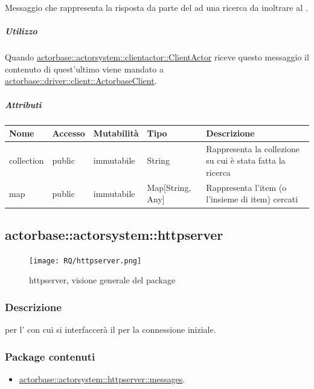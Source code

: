 \documentclass{scalatekids-article}
\begin{document}
Messaggio che rappresenta la risposta da parte del  ad una ricerca da inoltrare
al .

\subparagraph{Utilizzo}

Quando \hyperref[sec:actorbase::actorsystem::clientactor::ClientActor]{actorbase::actorsystem::clientactor::ClientActor}
riceve questo messaggio il contenuto di quest'ultimo viene
mandato a \hyperref[sec:actorbase::driver::client::ActorbaseClient]{actorbase::driver::\allowbreak{}client::\allowbreak{}ActorbaseClient}.

\subparagraph{Attributi}
\begin{tabular}{| p{1.5cm} | p{1.5cm} | p{2cm} | p{3.5cm} | p{8.5cm} |}
  \hline
  Nome & Accesso & Mutabilità & Tipo & Descrizione\\
  \hline
  collection & public & immutabile & String & Rappresenta la collezione su cui è stata fatta la ricerca \\
  \hline
  map & public & immutabile & Map[String, Any] & Rappresenta l'item (o l'insieme di item) cercati \\
  \hline
\end{tabular}


\subsection{actorbase::actorsystem::httpserver}
\label{sec:actorbase::actorsystem::httpserver}

\begin{figure}[H]
  \begin{center}
    \texttt{[image: RQ/httpserver.png]}
    \caption{httpserver, visione generale del package}
  \end{center}
\end{figure}

\subsubsection{Descrizione}
 per l' con cui si interfaccerà il  per la connessione iniziale.

\subsubsection{Package contenuti}
\begin{itemize}
\item \hyperref[sec:actorbase::actorsystem::httpserver::messages]{actorbase::actorsystem::httpserver::messages}.
\end{itemize}
\end{document}
